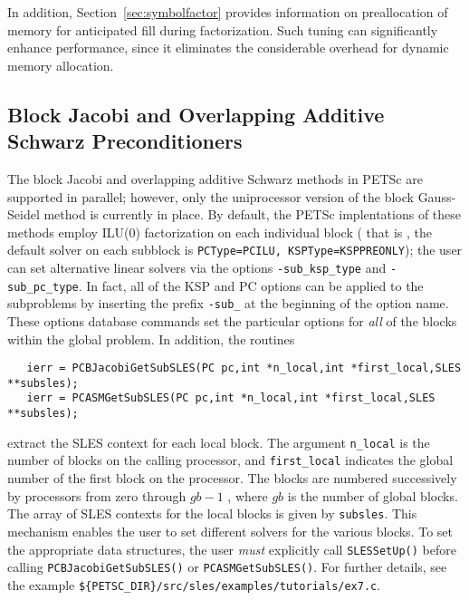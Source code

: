 In addition, Section~\ref{sec:symbolfactor} provides information on
preallocation of memory for anticipated fill during factorization.  
Such tuning can significantly enhance performance, since it
eliminates the considerable overhead for dynamic memory allocation.

\subsection{Block Jacobi and 
            Overlapping Additive Schwarz Preconditioners}
\label{sec:bjacobi}

 
  
The block Jacobi and overlapping additive Schwarz methods in PETSc are
supported in parallel; however, only the uniprocessor
version of the block Gauss-Seidel method is currently in place.
By default, the PETSc implentations of these methods
employ ILU(0) factorization on each individual block ( that is , the default solver on each 
subblock is {\tt PCType=PCILU,
KSPType=KSPPREONLY}); the user can set alternative linear solvers via the options 
 
{\tt -sub\_ksp\_type} and {\tt -sub\_pc\_type}. In fact, all of the KSP
and PC options can be applied to the subproblems by inserting the prefix
{\tt -sub\_} at the beginning of the option name. 
These options database commands set the particular options for {\em all} 
of the blocks within the global problem.  In addition, the routines
\begin{verbatim}
   ierr = PCBJacobiGetSubSLES(PC pc,int *n_local,int *first_local,SLES **subsles);
   ierr = PCASMGetSubSLES(PC pc,int *n_local,int *first_local,SLES **subsles);
\end{verbatim}
extract the  SLES context for each local 
block.  The argument {\tt n\_local} is the number of blocks on the 
calling processor, and {\tt first\_local} indicates the global number 
of the first block on the processor. The blocks are numbered 
successively by processors from zero through $ gb-1$ , 
where $ gb $ is the number of global blocks.  
The array of SLES contexts for the local blocks is given by {\tt subsles}. 
This mechanism enables the user to set different solvers for the 
various blocks.  To set the appropriate data structures, the 
user {\em must} explicitly call {\tt SLESSetUp()}  
before calling {\tt PCBJacobiGetSubSLES()} or
{\tt PCASMGetSubSLES()}.
For further details, see the 
example {\tt \$\{PETSC\_DIR\}/src/sles/examples/tutorials/ex7.c}.

